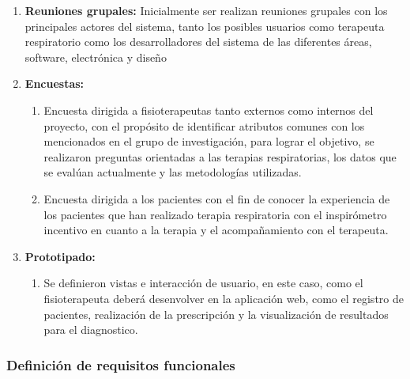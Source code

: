 \documentclass[12pt]{article}
\begin{document}
\begin{enumerate}
    \item \textbf{Reuniones grupales:} Inicialmente ser realizan reuniones grupales con los principales actores del sistema, tanto los posibles usuarios como terapeuta respiratorio como los desarrolladores del sistema de las diferentes áreas, software, electrónica y diseño
    \item \textbf{Encuestas:} 
        \begin{enumerate}
            \item Encuesta dirigida a fisioterapeutas tanto externos como internos del proyecto, con el propósito de identificar atributos comunes con los mencionados en el grupo de investigación, para lograr el objetivo, se realizaron preguntas orientadas a las terapias respiratorias, los datos que se evalúan actualmente y las metodologías utilizadas.
            \item Encuesta dirigida a los pacientes con el fin de conocer la experiencia de los pacientes que han realizado terapia respiratoria con el inspirómetro incentivo en cuanto a la terapia y el acompañamiento con el terapeuta.
        \end{enumerate}
        
    \item \textbf{Prototipado:} 
    
        \begin{enumerate}
            \item Se definieron vistas e interacción de usuario, en este caso, como el fisioterapeuta deberá desenvolver en la aplicación web, como el registro de pacientes, realización de la prescripción y la visualización de resultados para el diagnostico.
        \end{enumerate}
    
    
\end{enumerate}




\subsubsection{Definición de requisitos funcionales}

\end{document}
